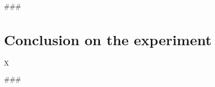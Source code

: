 

\usepackage{comment}




###

\section{Conclusion on the experiment}\label{sec:conclution}
X
\hfill\break



###

\begin{comment}
Author = DIEGO MICCOLI
Alias = Kozen88
Organization = SWAP Research Group UniBa
Date = 27-12-2023

This mini template is not working by itself because there are latex command missing needed
to compile the file and give as output a pdf file, in addition it has been added jinja
statement in order to control the rendering of the latex file with the jinja library, for these
reasons it needs to be used with the other mini chunks in conjunction.
\end{comment}